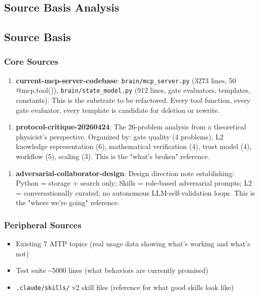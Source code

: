 \documentclass[11pt,a4paper]{article}
\begin{document}
\subsection*{Source Basis Analysis}
\subsection*{Source Basis}

\subsubsection*{Core Sources}

\begin{enumerate}
\item \textbf{current-mcp-server-codebase}: \texttt{brain/mcp\_server.py} (3273 lines, 50 @mcp.tool()), \texttt{brain/state\_model.py} (912 lines, gate evaluators, templates, constants). This is the substrate to be refactored. Every tool function, every gate evaluator, every template is candidate for deletion or rewrite.
\end{enumerate}

\begin{enumerate}
\item \textbf{protocol-critique-20260424}: The 26-problem analysis from a theoretical physicist's perspective. Organized by: gate quality (4 problems), L2 knowledge representation (6), mathematical verification (4), trust model (4), workflow (5), scaling (3). This is the "what's broken" reference.
\end{enumerate}

\begin{enumerate}
\item \textbf{adversarial-collaborator-design}: Design direction note establishing: Python = storage + search only; Skills = role-based adversarial prompts; L2 = conversationally curated; no autonomous LLM-self-validation loops. This is the "where we're going" reference.
\end{enumerate}

\subsubsection*{Peripheral Sources}

\begin{itemize}
\item Existing 7 AITP topics (real usage data showing what's working and what's not)
\item Test suite \textasciitilde 5000 lines (what behaviors are currently promised)
\item \texttt{.claude/skills/} v2 skill files (reference for what good skills look like)
\end{itemize}
\end{document}
